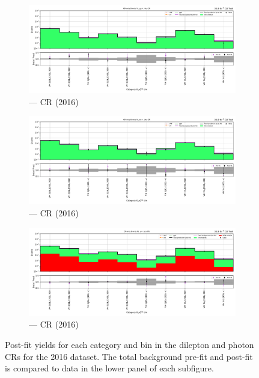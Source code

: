 \begin{figure}[htbp]
    \centering
    \begin{subfigure}[b]{0.9\textwidth}
        \includegraphics[width=\textwidth]{chapters/higgstoinv/figures/mountain_ranges/2016/VH/Zmumu_tree_fit_b-abs_values_VH_cats.pdf}
        \caption{\VH --- \doubleMuCr \gls{CR} (2016)}
    \end{subfigure}

    \begin{subfigure}[b]{0.9\textwidth}
        \includegraphics[width=\textwidth]{chapters/higgstoinv/figures/mountain_ranges/2016/VH/Zee_tree_fit_b-abs_values_VH_cats.pdf}
        \caption{\VH --- \doubleEleCr \gls{CR} (2016)}
    \end{subfigure}

    \begin{subfigure}[b]{0.9\textwidth}
        \includegraphics[width=\textwidth]{chapters/higgstoinv/figures/mountain_ranges/2016/VH/Photon_tree_fit_b-abs_values_VH_cats.pdf}
        \caption{\VH --- \singlePhotonCr \gls{CR} (2016)}
    \end{subfigure}
    \caption[Post-fit yields for each \VH category and \ptmiss bin in the dilepton and photon control regions for the 2016 dataset]{Post-fit yields for each \VH category and \ptmiss bin in the dilepton and photon \glspl{CR} for the 2016 dataset. The total background pre-fit and post-fit is compared to data in the lower panel of each subfigure.}
    \label{fig:htoinv_mountain_range_VH_2016_dilep_photon_CRs}
\end{figure}

